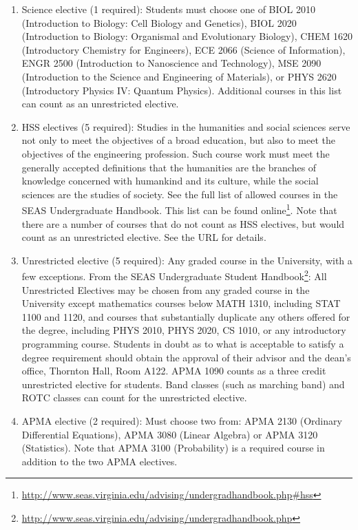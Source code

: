 \documentclass[10pt,letter]{book}
\newcommand{\myurl}[1]{\footnote{\scriptsize\url{#1}}}
\begin{document}
\begin{enumerate}

\item Science elective (1 required): Students must choose one of BIOL
  2010 (Introduction to Biology: Cell Biology and Genetics),
  BIOL 2020 (Introduction to Biology: Organismal and
  Evolutionary Biology), CHEM 1620 (Introductory Chemistry for
  Engineers), ECE 2066 (Science of Information), ENGR 2500
  (Introduction to Nano\-science and Technology), MSE 2090
  (Introduction to the Science and Engineering of Materials), or PHYS
  2620 (Introductory Physics IV: Quantum Physics). Additional
  courses in this list can count as an unrestricted elective.

\item HSS electives (5 required): Studies in the humanities and social
  sciences serve not only to meet the objectives of a broad education,
  but also to meet the objectives of the engineering profession. Such
  course work must meet the generally accepted definitions that the
  humanities are the branches of knowledge concerned with humankind
  and its culture, while the social sciences are the studies of
  society. See the full list of allowed courses in the SEAS
  Undergraduate Handbook. This list can be found
  online\myurl{http://www.seas.virginia.edu/advising/undergradhandbook.php\#hss}. Note
  that there are a number of courses that do not count as HSS
  electives, but would count as an unrestricted elective. See the URL
  for details.

\item Unrestricted elective (5 required): Any graded course in the
  University, with a few exceptions. From the SEAS Undergraduate
  Student Handbook\myurl{http://www.seas.virginia.edu/advising/undergradhandbook.php}:
  All Unrestricted Electives may be chosen from any graded course in
  the University except mathematics courses below MATH 1310,
  including STAT 1100 and 1120, and courses that
  substantially duplicate any others offered for the degree, including
  PHYS 2010, PHYS 2020, CS 1010, or any introductory
  programming course. Students in doubt as to what is acceptable to
  satisfy a degree requirement should obtain the approval of their
  advisor and the dean's office, Thornton Hall, Room A122. APMA 1090
  counts as a three credit unrestricted elective for
  students. Band classes (such as marching band) and ROTC classes can
  count for the unrestricted elective.

\item APMA elective (2 required): Must choose two from: APMA 2130
  (Ordinary Differential Equations), APMA 3080 (Linear
  Algebra) or APMA 3120 (Statistics). Note that APMA 3100
  (Probability) is a required course in addition to the two APMA
  electives.


\end{enumerate}
\end{document}
